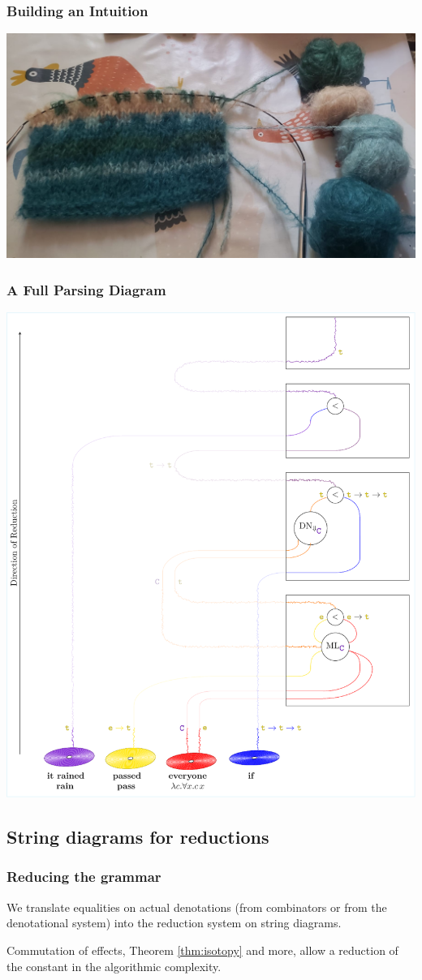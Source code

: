 \documentclass[math, english, info]{beamercours}
\begin{document}
\begin{frame}
	\frametitle{Building an Intuition}
	\centering
	\includegraphics[width=.7\textwidth]{aux/figures/knitting-example.jpeg}
\end{frame}

\begin{frame}
	\frametitle{A Full Parsing Diagram}
	\centering
	\includegraphics[height=.8\textheight]{aux/figures/3d-parsing-diagram.pdf}
\end{frame}

\subsection{String diagrams for reductions}
\begin{frame}
	\frametitle{Reducing the grammar}
	We translate equalities on actual denotations (from combinators or from the denotational system) into the reduction system on string diagrams.
	\smallskip

	Commutation of effects, Theorem \ref{thm:isotopy} and more, allow a reduction of the constant in the algorithmic complexity.
\end{frame}
\end{document}

